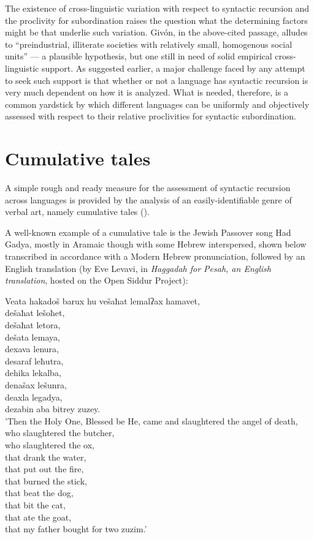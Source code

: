 \documentclass[output=paper,colorlinks,citecolor=brown
]{langscibook}
\begin{document}
The existence of cross-linguistic variation with respect to syntactic recursion and the proclivity for subordination raises the question what the determining factors might be that underlie such variation.  Givón, in the above-cited passage, alludes to ``preindustrial, illiterate societies with relatively small, homogenous social units'' — a plausible hypothesis, but one still in need of solid empirical cross-linguistic support.  As suggested earlier, a major challenge faced by any attempt to seek such support is that whether or not a language has syntactic recursion is very much dependent on how it is analyzed.  What is needed, therefore, is a common yardstick by which different languages can be uniformly and objectively assessed with respect to their relative proclivities for syntactic subordination.

\section{Cumulative tales}
A simple rough and ready measure for the assessment of syntactic recursion across languages is provided by the analysis of an easily-identifiable genre of verbal art, namely cumulative tales (\cites[230—234]{thompson1946folktale}[522--536]{aarne1961types}).

A well-known example of a cumulative tale is the Jewish Passover song Had Gadya, mostly in Aramaic though with some Hebrew interspersed, shown below transcribed in accordance with a Modern Hebrew pronunciation, followed by an English translation (by Eve Levavi, in \textit{Haggadah for Pesah, an English translation}, hosted on the Open Siddur Project):

\ea \label{ex:gil:10}

Veata hakadoš barux hu vešaħat lemalʔax hamavet,\\	
 dešaħat lešoħet,\\
 dešaħat letora,\\
 dešata lemaya,\\
 dexava lenura,\\
 desaraf leħutra,\\
 dehika lekalba,\\
 denašax lešunra,\\
 deaxla legadya,\\
 dezabin aba bitrey zuzey.\\

 'Then the Holy One, Blessed be He, came and slaughtered the angel of death,\\
 who slaughtered the butcher,\\
 who slaughtered the ox, \\
 that drank the water, \\
 that put out the fire, \\
 that burned the stick, \\
 that beat the dog, \\
 that bit the cat, \\
 that ate the goat, \\
 that my father bought for two zuzim.'
\end{document}
